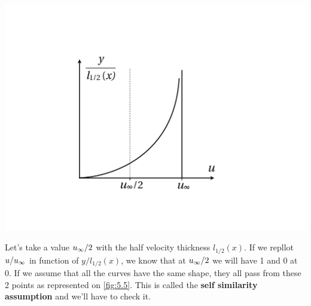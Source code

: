 \begin{center}
\begin{minipage}{0.3\textwidth}
	 	 	\begin{center}
	 	 	\includegraphics[scale=0.235]{ch5/5}
	 	 	\end{center}
	 		\label{fig:5.5}
	 \end{minipage}
		 \end{center}


	 Let's take a value $\uinf /2$ with the half velocity thickness $l_{1/2}(x)$. If we repllot $u/\uinf$ in function of $y/l_{1/2}(x)$, we know that at $\uinf /2$ we will have 1 and 0 at 0. If we assume that all the curves have the same shape, they all pass from these 2 points as represented on \autoref{fig:5.5}. This is called the \textbf{self similarity assumption} and we'll have to check it.  		 \\
		 
